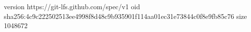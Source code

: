 version https://git-lfs.github.com/spec/v1
oid sha256:4c9c222502513ee4998f8d48c9b935901f114aa01ec31e73844c0f8e9fb85c76
size 1048672
